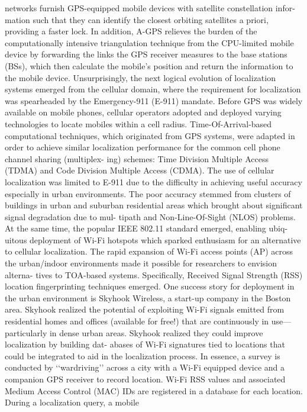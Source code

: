 networks furnish GPS-equipped mobile devices with satellite constellation infor-
mation such that they can identify the closest orbiting satellites a priori, providing a
faster lock. In addition, A-GPS relieves the burden of the computationally intensive
triangulation technique from the CPU-limited mobile device by forwarding the links
the GPS receiver measures to the base stations (BSs), which then calculate the
mobile’s position and return the information to the mobile device.
Unsurprisingly, the next logical evolution of localization systems emerged from
the cellular domain, where the requirement for localization was spearheaded by the
Emergency-911 (E-911) mandate. Before GPS was widely available on mobile
phones, cellular operators adopted and deployed varying technologies to locate
mobiles within a cell radius. Time-Of-Arrival-based computational techniques,
which originated from GPS systems, were adapted in order to achieve similar
localization performance for the common cell phone channel sharing (multiplex-
ing) schemes: Time Division Multiple Access (TDMA) and Code Division
Multiple Access (CDMA). The use of cellular localization was limited to E-911
due to the difficulty in achieving useful accuracy especially in urban environments.
The poor accuracy stemmed from clusters of buildings in urban and suburban
residential areas which brought about significant signal degradation due to mul-
tipath and Non-Line-Of-Sight (NLOS) problems.
At the same time, the popular IEEE 802.11 standard emerged, enabling ubiq-
uitous deployment of Wi-Fi hotspots which sparked enthusiasm for an alternative
to cellular localization. The rapid expansion of Wi-Fi access points (AP) across the
urban/indoor environments made it possible for researchers to envision alterna-
tives to TOA-based systems. Specifically, Received Signal Strength (RSS) location
fingerprinting techniques emerged. One success story for deployment in the urban
environment is Skyhook Wireless, a start-up company in the Boston area. Skyhook
realized the potential of exploiting Wi-Fi signals emitted from residential homes
and offices (available for free!) that are continuously in use—particularly in dense
urban areas. Skyhook realized they could improve localization by building dat-
abases of Wi-Fi signatures tied to locations that could be integrated to aid in the
localization process. In essence, a survey is conducted by ‘‘wardriving’’ across a
city with a Wi-Fi equipped device and a companion GPS receiver to record
location. Wi-Fi RSS values and associated Medium Access Control (MAC) IDs
are registered in a database for each location. During a localization query, a mobile
